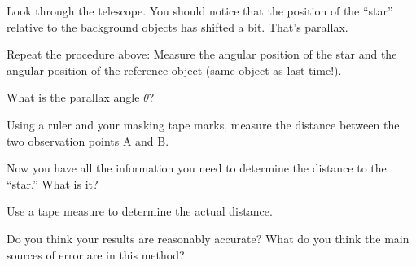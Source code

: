 Look through the telescope.  You should notice that the position
of the ``star'' relative to the background objects has shifted
a bit.  That's parallax.

Repeat the procedure above: Measure the angular position of the
star and the angular position of the reference object (same object
as last time!).  

\answerspace{2.5in}

What is the parallax angle $\theta$?

\answerspace{1in}

Using a ruler and your masking tape marks, measure the distance between
the two observation points A and B.

\answerspace{1in}

Now you have all the information you need to determine the distance to
the ``star.''  What is it?

\answerspace{1in}

Use a tape measure to determine the actual distance.

\answerspace{1in}

Do you think your results are reasonably accurate?  What
do you think the main sources of error are in this method?






